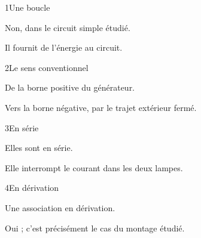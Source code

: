 \par\noindent\begin{minipage}{\linewidth}
\begin{corrige}{1}{Une boucle}
\begin{questions}
\item Non, dans le circuit simple étudié.
\item Il fournit de l’énergie au circuit.
\end{questions}
\end{corrige}
\end{minipage}
\par\noindent\begin{minipage}{\linewidth}
\begin{corrige}{2}{Le sens conventionnel}
\begin{questions}
\item De la borne positive du générateur.
\item Vers la borne négative, par le trajet extérieur fermé.
\end{questions}
\end{corrige}
\end{minipage}
\par\noindent\begin{minipage}{\linewidth}
\begin{corrige}{3}{En série}
\begin{questions}
\item Elles sont en série.
\item Elle interrompt le courant dans les deux lampes.
\end{questions}
\end{corrige}
\end{minipage}
\par\noindent\begin{minipage}{\linewidth}
\begin{corrige}{4}{En dérivation}
\begin{questions}
\item Une association en dérivation.
\item Oui ; c’est précisément le cas du montage étudié.
\end{questions}
\end{corrige}
\end{minipage}

